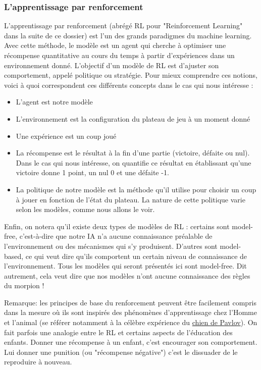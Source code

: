 \documentclass[french]{article}
\begin{document}
    \subsubsection{L'apprentissage par renforcement}
    L'apprentissage par renforcement (abrégé RL pour "Reinforcement Learning" dans la suite de ce dossier) est l'un des grands paradigmes du machine learning. Avec cette méthode, le modèle est un agent qui cherche à optimiser une récompense quantitative au cours du temps à partir d'expériences dans un environnement donné. L'objectif d'un modèle de RL est d'ajuster son comportement, appelé politique ou stratégie. Pour mieux comprendre ces notions, voici à quoi correspondent ces différents concepts dans le cas qui nous intéresse :
    \begin{itemize}
        \item L'agent est notre modèle
        \item L'environnement est la configuration du plateau de jeu à un moment donné
        \item Une expérience est un coup joué 
        \item La récompense est le résultat à la fin d'une partie (victoire, défaite ou nul). Dans le cas qui nous intéresse, on quantifie ce résultat en établissant qu'une victoire donne 1 point, un nul 0 et une défaite -1.
        \item La politique de notre modèle est la méthode qu'il utilise pour choisir un coup à jouer en fonction de l'état du plateau. La nature de cette politique varie selon les modèles, comme nous allons le voir.
    \end{itemize}
    Enfin, on notera qu'il existe deux types de modèles de RL : certains sont model-free, c'est-à-dire que notre IA n'a aucune connaissance préalable de l'environnement ou des mécanismes qui s'y produisent. D'autres sont model-based, ce qui veut dire qu'ils comportent un certain niveau de connaissance de l'environnement. Tous les modèles qui seront présentés ici sont model-free. Dit autrement, cela veut dire que nos modèles n'ont aucune connaissance des règles du morpion !
    
    Remarque: les principes de base du renforcement peuvent être facilement compris dans la mesure où ils sont inspirés des phénomènes d'apprentissage chez l'Homme et l'animal (se référer notamment à la célèbre expérience du \href{https://journals.openedition.org/bibnum/604}{chien de Pavlov}). On fait parfois une analogie entre le RL et certains aspects de l'éducation des enfants. Donner une récompense à un enfant, c'est encourager son comportement. Lui donner une punition (ou "récompense négative") c'est le dissuader de le reproduire à nouveau.
\end{document}
